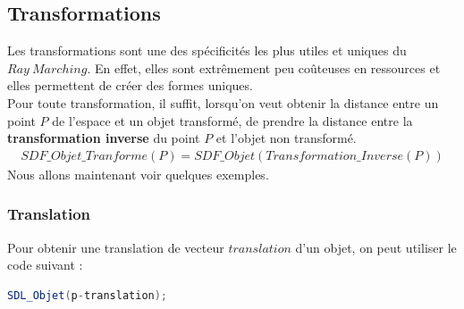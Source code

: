\newpage
\subsection{Transformations}\label{subsec:Transformations}
Les transformations sont une des spécificités les plus utiles et uniques du $Ray\ Marching$. En effet, elles sont extrêmement peu coûteuses en ressources et elles permettent de créer des formes uniques.
\\Pour toute transformation, il suffit, lorsqu'on veut obtenir la distance entre un point $P$ de l'espace et un objet transformé, de prendre la distance entre la \textbf{transformation inverse} du point $P$ et l'objet non transformé.
\begin{align*}
    SDF\_Objet\_Tranforme(P)=SDF\_Objet(Transformation\_Inverse(P))
\end{align*}
Nous allons maintenant voir quelques exemples.

\subsubsection{Translation}
Pour obtenir une translation de vecteur $translation$ d'un objet, on peut utiliser le code suivant :
\begin{lstlisting}[language=GLSL]
SDL_Objet(p-translation);
\end{lstlisting}

